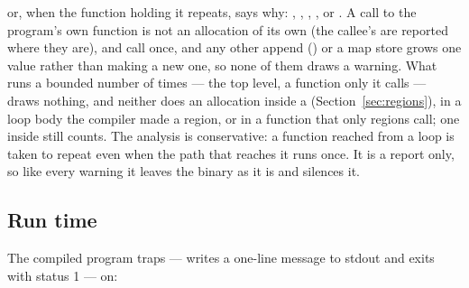\begin{center}
\end{center}

\noindent or, when the function holding it repeats, says why:
, ,
, , or
. A call to the program's own
function is not an allocation of its own (the callee's are reported where
they are),  and  call  once, and any other
append (\ic{+=}) or a map store grows one value rather than making a new one,
so none of them draws a warning. What runs a bounded number of times --- the
top level, a function only it calls --- draws nothing, and neither does an
allocation inside a  (Section~\ref{sec:regions}), in a loop body
the compiler made a region, or in a function that only regions call; one
inside  still counts. The analysis is
conservative: a function reached from a loop is taken to repeat even when
the path that reaches it runs once. It is a report only, so like every
warning it leaves the binary as it is and  silences it.

\subsection{Run time}

The compiled program traps --- writes a one-line message to stdout and
exits with status 1 --- on:

